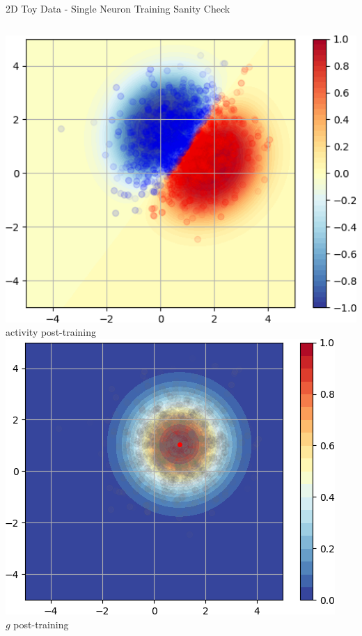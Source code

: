 \documentclass{beamer}
\begin{document}
\begin{frame}{2D Toy Data - Single Neuron Training Sanity Check}
\begin{columns}
    \hspace{0.1cm}
    \begin{column}{.31\textwidth}
        \includegraphics[width=1.02\textwidth]{images/2D-single-neuron/2d-easy-trained-activity-cropped.png}\\
        \centering\footnotesize{activity post-training}\\
        \includegraphics[width=\textwidth]{images/2D-single-neuron/2d-easy-trainedg-cropped.png}\\
         \centering\footnotesize{$g$ post-training}
    \end{column} 
    

\end{columns}
\end{frame}
\end{document}
